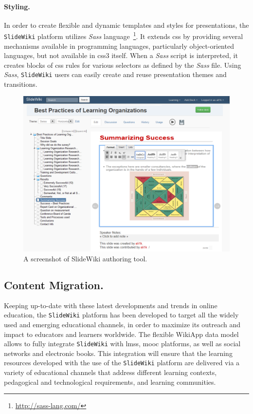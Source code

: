 \documentclass[PhD, Submit, ngerman,UKenglish,table]{scrbook}
\begin{document}
\paragraph{Styling.}
In order to create flexible and dynamic templates and styles for presentations, the \texttt{SlideWiki} platform utilizes \emph{Sass} language~\footnote{\url{http://sass-lang.com/}}.
It extends \gls{css} by providing several mechanisms available in programming languages, particularly object-oriented languages, but not available in \gls{css}3 itself.
When a \emph{Sass} script is interpreted, it creates blocks of \gls{css} rules for various selectors as defined by the \emph{Sass} file.
Using \emph{Sass}, \texttt{SlideWiki} users can easily create and reuse presentation themes and transitions.


\begin{figure}[t!]
	\centering
		\includegraphics[width=\textwidth]{images/screenshot1.png}
	\caption{A screenshot of SlideWiki authoring tool.}
	\label{fig:authoring_screenshot}
\end{figure}


\subsection{Content Migration.}
\label{sec:content_migration}
Keeping up-to-date with these latest developments and trends in online education, the \texttt{SlideWiki} platform has been developed to target all the widely used and emerging educational channels, in order to maximize its outreach and impact to educators and learners worldwide.
The flexible WikiApp data model allows to fully integrate \texttt{SlideWiki} with \gls{lms}s, \gls{mooc} platforms, as well as social networks and electronic books.
This integration will ensure that the learning resources developed with the use of the \texttt{SlideWiki} platform are delivered via a variety of educational channels that address different learning contexts, pedagogical and technological requirements, and learning communities. 
\end{document}
